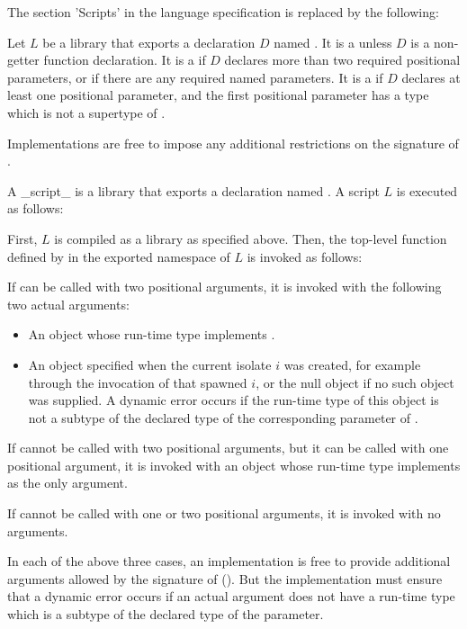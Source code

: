 \documentclass[makeidx]{article}
\begin{document}
{The section 'Scripts' in the language specification is replaced by the
following:

Let $L$ be a library that exports a declaration $D$ named .  It is a
 unless $D$ is a non-getter function declaration.  It is a
 if $D$ declares more than two required positional
parameters, or if there are any required named parameters.  It is a
 if $D$ declares at least one positional parameter,
and the first positional parameter has a type which is not a supertype of
.

Implementations are free to impose any additional restrictions on the
signature of .

A _script_ is a library that exports a declaration named .
A script $L$ is executed as follows:

First, $L$ is compiled as a library as specified above.
Then, the top-level function defined by 
in the exported namespace of $L$ is invoked as follows:

If  can be called with two positional arguments,
it is invoked with the following two actual arguments:

\begin{itemize}
\item An object whose run-time type implements .
\item An object specified when the current isolate $i$ was created,
  for example through the invocation of  that spawned $i$,
  or the null object if no such object was supplied.
  A dynamic error occurs if the run-time type of this object is not a
  subtype of the declared type of the corresponding parameter of .
\end{itemize}

If  cannot be called with two positional arguments, but it can be
called with one positional argument, it is invoked with an object whose
run-time type implements  as the only argument.

If  cannot be called with one or two positional arguments, it is
invoked with no arguments.

In each of the above three cases, an implementation is free to provide
additional arguments allowed by the signature of 
().
But the implementation must ensure that a dynamic error occurs if an
actual argument does not have a run-time type which is a subtype of
the declared type of the parameter.

}
\end{document}
